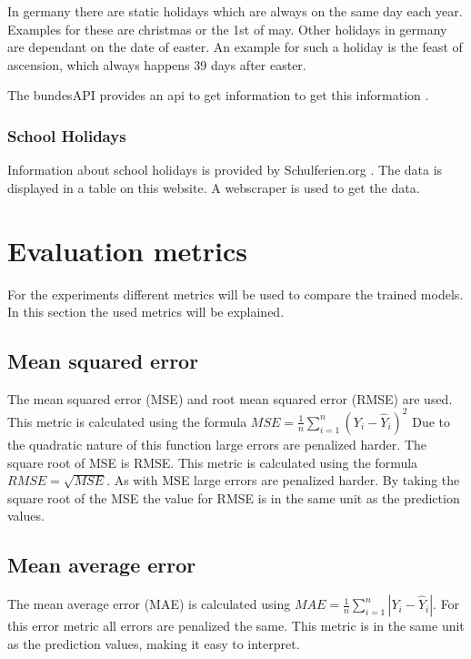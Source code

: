 \documentclass[class=scrbook, crop=false]{standalone}
\begin{document}
In germany there are static holidays which are always on the same day each year.
Examples for these are christmas or the 1st of may. 
Other holidays in germany are dependant on the date of easter. 
An example for such a holiday is the feast of ascension, which always happens 39 days after easter.

The bundesAPI provides an api to get information to get this information \cite{HolidayAPIUrl}.

\subsubsection{School Holidays}

Information about school holidays is provided by Schulferien.org \cite{SchoolHolidays}. 
The data is displayed in a table on this website. 
A webscraper is used to get the data.

\section{Evaluation metrics}
\label{Section:Evaluation_Metrics}

For the experiments different metrics will be used to compare the trained models. 
In this section the used metrics will be explained.

\subsection{Mean squared error}

The mean squared error (MSE) and root mean squared error (RMSE) are used.
This metric is calculated using the formula $MSE = \frac{1}{n} \sum_{i=1}^{n}(Y_i - \hat{Y}_i)^2$
Due to the quadratic nature of this function large errors are penalized harder.
The square root of MSE is RMSE. 
This metric is calculated using the formula $RMSE = \sqrt{MSE}$.
As with MSE large errors are penalized harder.
By taking the square root of the MSE the value for RMSE is in the same unit as the prediction values.

\subsection{Mean average error}
The mean average error (MAE) is calculated using $MAE = \frac{1}{n} \sum_{i=1}^{n}|Y_i - \hat{Y}_i|$.
For this error metric all errors are penalized the same.
This metric is in the same unit as the prediction values, making it easy to interpret.
\end{document}
